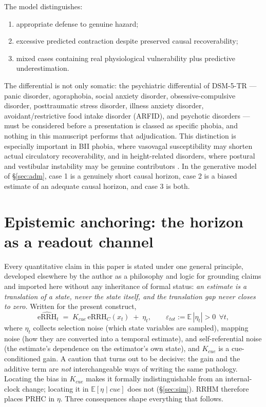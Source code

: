 \documentclass[9pt,twocolumn]{article}
\newcommand{\eRRHc}{\mathrm{eRRH}_{C}}
\newcommand{\eRRHhat}{\widehat{\mathrm{eRRH}}}
\begin{document}
The model distinguishes:
\begin{enumerate}
\item appropriate defense to genuine hazard;
\item excessive predicted contraction despite preserved causal recoverability;
\item mixed cases containing real physiological vulnerability plus predictive underestimation.
\end{enumerate}

The differential is not only somatic: the psychiatric differential of DSM-5-TR --- panic disorder, agoraphobia, social anxiety disorder, obsessive-compulsive disorder, posttraumatic stress disorder, illness anxiety disorder, avoidant/restrictive food intake disorder (ARFID), and psychotic disorders --- must be considered before a presentation is classed as specific phobia, and nothing in this manuscript performs that adjudication. This distinction is especially important in BII phobia, where vasovagal susceptibility may shorten actual circulatory recoverability, and in height-related disorders, where postural and vestibular instability may be genuine contributors \cite{ayala2009,ritz2010,huppert2020}. In the generative model of \S\ref{sec:adm}, case 1 is a genuinely short causal horizon, case 2 is a biased estimate of an adequate causal horizon, and case 3 is both.

\section{Epistemic anchoring: the horizon as a readout channel}
\label{sec:anchor}
Every quantitative claim in this paper is stated under one general principle, developed elsewhere by the author as a philosophy and logic for grounding claims \cite{lahtee2026ru,lahtee2026rc} and imported here without any inheritance of formal status: \emph{an estimate is a translation of a state, never the state itself, and the translation gap never closes to zero.} Written for the present construct,
\begin{equation}
\eRRHhat_t \;=\; K_{cue}\,\eRRHc(x_t)\;+\;\eta_t,\qquad \varepsilon_{tot}:=\mathbb{E}\,|\eta_t|>0\ \ \forall t,
\label{eq:recordlaw}
\end{equation}
where $\eta_t$ collects selection noise (which state variables are sampled), mapping noise (how they are converted into a temporal estimate), and self-referential noise (the estimate's dependence on the estimator's own state), and $K_{cue}$ is a cue-conditioned gain. A caution that turns out to be decisive: the gain and the additive term are \emph{not} interchangeable ways of writing the same pathology. Locating the bias in $K_{cue}$ makes it formally indistinguishable from an internal-clock change; locating it in $\mathbb{E}[\eta\mid cue]$ does not (\S\ref{sec:sim}). RRHM therefore places PRHC in $\eta$. Three consequences shape everything that follows.
\end{document}
